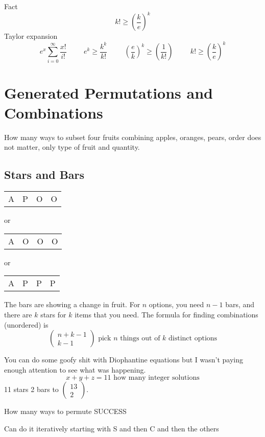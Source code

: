\documentclass{report}
\begin{document}
Fact
\[
k! \geq \left( \frac{k}{e} \right)^k 
\]
Taylor expansion
\[
e^x \sum^\infty_{i=0}\frac{x!}{i!} 
\hspace{1cm}
e^k \geq \frac{k^k}{k!}
\hspace{1cm}
\left( \frac{e}{k} \right)^k \geq 
\left( \frac{1}{k!} \right)
\hspace{1cm}
k! \geq \left( \frac{k}{e} \right)^k
\]


\chapter{Generated Permutations and Combinations}
How many ways to subset four fruits combining apples, oranges, pears, order does not matter, only type of fruit and quantity.

\section{Stars and Bars}
\begin{center}
\begin{tabular}{c | c | c c}
A & P & O & O
\end{tabular}
or 
\begin{tabular}{c | |c  c c}
A & O & O & O
\end{tabular}
or
\begin{tabular}{c  | c  c c |}
A & P & P & P
\end{tabular}
\end{center}

The bars are showing a change in fruit. For $n$ options, you need $n-1$ bars, and there are $k$ stars for $k$ items that you need. The formula for finding combinations (unordered) is 
\[
\begin{pmatrix} n+k -1\\ k-1 \end{pmatrix}
\textrm{ pick $n$ things out of $k$ distinct options}
\]

You can do some goofy shit with Diophantine equations but I wasn't paying enough attention to see what was happening.
\[
x + y + z = 11 \textrm{ how many integer solutions}
\]
11 stars 2 bars to $\begin{pmatrix} 13 \\ 2 \end{pmatrix}$.

How many ways to permute SUCCESS

Can do it iteratively starting with S and then C and then the others
\end{document}
